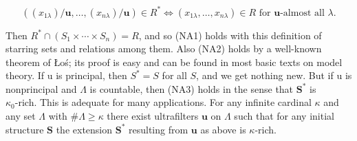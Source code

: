 \documentclass[10pt]{article}
\begin{document}
$$
\left(\left(x_{1 \lambda}\right) / \mathbf{u}, \ldots,\left(x_{n \lambda}\right) / \mathbf{u}\right) \in R^{*} \Longleftrightarrow\left(x_{1 \lambda}, \ldots, x_{n \lambda}\right) \in R \text { for } \mathbf{u} \text {-almost all } \lambda .
$$

Then $R^{*} \cap\left(S_{1} \times \cdots \times S_{n}\right)=R$, and so (NA1) holds with this definition of starring sets and relations among them. Also (NA2) holds by a well-known theorem of Łoś; its proof is easy and can be found in most basic texts on model theory. If u is principal, then $S^{*}=S$ for all $S$, and we get nothing new. But if u is nonprincipal and $\Lambda$ is countable, then (NA3) holds in the sense that $\mathbf{S}^{*}$ is\\
$\kappa_{0}$-rich. This is adequate for many applications. For any infinite cardinal $\kappa$ and any set $\Lambda$ with $\# \Lambda \geq \kappa$ there exist ultrafilters $\mathbf{u}$ on $\Lambda$ such that for any initial structure $\mathbf{S}$ the extension $\mathbf{S}^{*}$ resulting from $\mathbf{u}$ as above is $\kappa$-rich.
\end{document}
